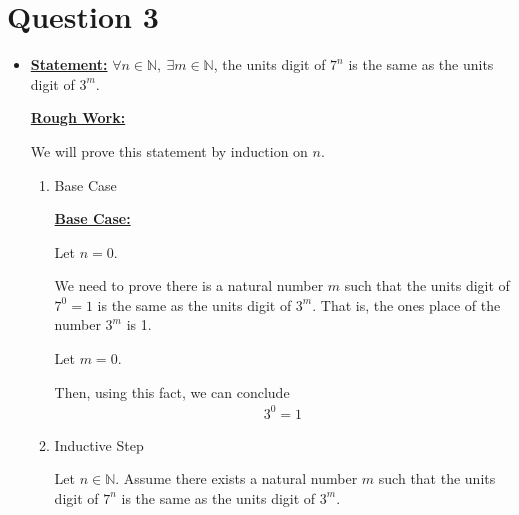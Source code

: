 \documentclass[12pt]{article}
\begin{document}
\section*{Question 3}
\begin{itemize}
    \item

    \underline{\textbf{Statement:}} $\forall n \in \mathbb{N},\:\exists m \in \mathbb{N}$,
    the units digit of $7^n$ is the same as the units digit of $3^m$.

    \bigskip

    \begin{mdframed}
        \underline{\textbf{Rough Work:}}

        \bigskip

        We will prove this statement by induction on $n$.

        \bigskip

        \begin{enumerate}[1.]
            \item Base Case

            \begin{mdframed}

            \underline{\textbf{Base Case:}}

            \bigskip

            Let $n = 0$.

            \bigskip

            We need to prove there is a natural number $m$ such that the
            units digit of $7^0 = 1$ is the same as the units digit of $3^m$. That is,
            the ones place of the number $3^m$ is 1.

            \bigskip

            Let $m = 0$.

            \bigskip

            Then, using this fact, we can conclude
            \setcounter{equation}{0}
            \begin{align}
                3^0 = 1
            \end{align}

            \end{mdframed}

            \item Inductive Step

            Let $n \in \mathbb{N}$. Assume there exists a natural number $m$ such that
            the units digit of $7^n$ is the same as the units digit of $3^m$.


\end{enumerate}
\end{mdframed}
\end{itemize}
\end{document}
